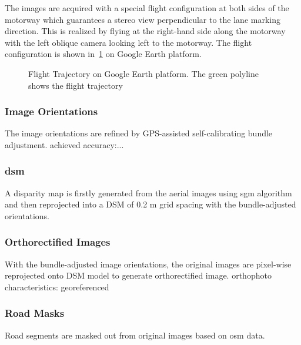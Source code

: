 \clearpage

The images are acquired with a special flight configuration at both sides of the motorway which guarantees a stereo view perpendicular to the lane marking direction. This is realized by flying at the right-hand side along the motorway with the left oblique camera looking left to the motorway. The flight configuration is shown in~\cref{fig:FlightTrajectory} on Google Earth platform.

\begin{figure}[!h]
  \centering
  \caption{Flight Trajectory on Google Earth platform. The green polyline shows the flight trajectory}
  \label{fig:FlightTrajectory}
\end{figure}


\subsubsection{Image Orientations}
The image orientations are refined by GPS-assisted self-calibrating bundle adjustment.
achieved accuracy:...



\subsubsection{\gls{dsm}}
A disparity map is firstly generated from the aerial images using \gls{sgm} algorithm and then reprojected into a DSM of 0.2 m grid spacing with the bundle-adjusted orientations.

\subsubsection{Orthorectified Images}
With the bundle-adjusted image orientations, the original images are pixel-wise reprojected onto DSM model to generate orthorectified image. 
orthophoto characteristics:
georeferenced

\subsubsection{Road Masks}
Road segments are masked out from original images based on \gls{osm} data.

